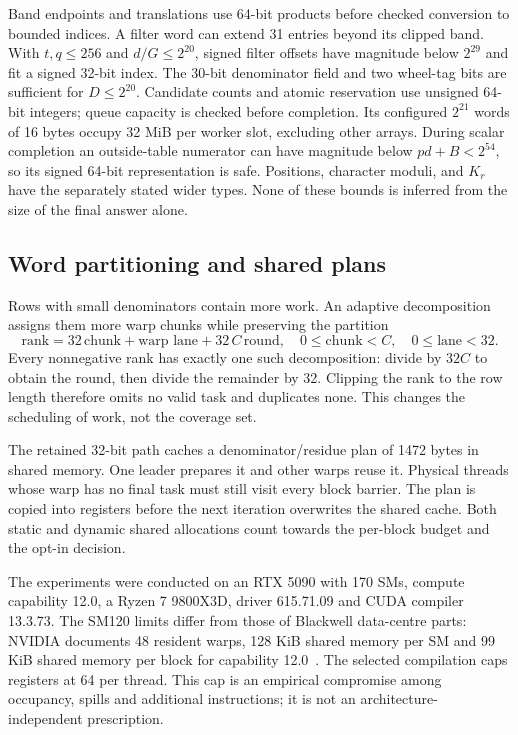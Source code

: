 \documentclass[11pt]{article}
\theoremstyle{definition}\newtheorem{remark}[theorem]{Remark}
\begin{document}
Band endpoints and translations use 64-bit products before checked
conversion to bounded indices. A filter word can extend 31 entries beyond
its clipped band. With $t,q\le256$ and $d/G\le2^{20}$, signed filter
offsets have magnitude below $2^{29}$ and fit a signed 32-bit index.
The 30-bit denominator field and two wheel-tag bits are sufficient for
$D\le2^{20}$. Candidate counts and atomic reservation use unsigned
64-bit integers; queue capacity is checked before completion. Its
configured $2^{21}$ words of 16 bytes occupy 32 MiB per worker slot, excluding
other arrays. During scalar completion an outside-table numerator can
have magnitude below $pd+B<2^{54}$, so its signed 64-bit representation
is safe. Positions, character moduli, and $K_r$ have the separately stated
wider types. None of these bounds is inferred from the size of the final
answer alone.

\subsection{Word partitioning and shared plans}
Rows with small denominators contain more work. An adaptive decomposition
assigns them more warp chunks while preserving the partition
\begin{equation}\label{eq:partition}
 \text{rank}=32\,\text{chunk}+\text{warp lane}
              +32\,C\,\text{round},\quad
 0\le\text{chunk}<C,\quad0\le\text{lane}<32.
\end{equation}
Every nonnegative rank has exactly one such decomposition: divide by $32C$
to obtain the round, then divide the remainder by 32. Clipping the rank to
the row length therefore omits no valid task and duplicates none. This
changes the scheduling of work, not the coverage set.

The retained 32-bit path caches a denominator/residue plan of 1472 bytes in
shared memory. One leader prepares it and other warps reuse it. Physical
threads whose warp has no final task must still visit every block barrier.
The plan is copied into registers before the next iteration overwrites the
shared cache. Both static and dynamic shared allocations count towards the
per-block budget and the opt-in decision.

The experiments were conducted on an RTX 5090 with 170 SMs, compute
capability 12.0, a Ryzen 7 9800X3D, driver 615.71.09 and CUDA compiler
13.3.73. The SM120 limits differ from those of Blackwell data-centre
parts: NVIDIA documents 48 resident warps, 128 KiB shared memory per SM and
99 KiB shared memory per block for capability 12.0~\cite{blackwell}.
The selected compilation caps registers at 64 per thread. This cap is an
empirical compromise among occupancy, spills and additional instructions;
it is not an architecture-independent prescription.
\end{document}

